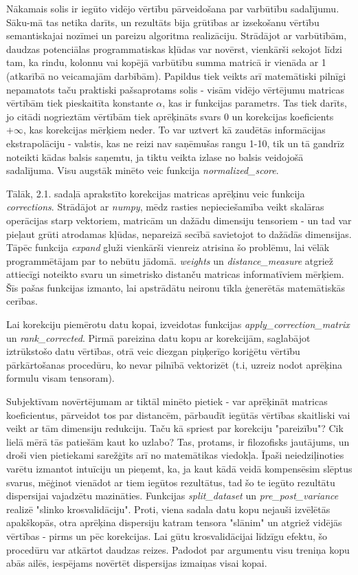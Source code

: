 \documentclass[12pt, a4paper]{article}
\numberwithin{equation}{section} %
\begin{document}
Nākamais solis ir iegūto vidējo vērtību pārveidošana par varbūtību sadalījumu. Sāku-mā tas netika darīts, un rezultāts bija grūtības ar izsekošanu vērtību semantiskajai nozīmei un pareizu algoritma realizāciju. Strādājot ar varbūtībām, daudzas potenciālas programmatiskas kļūdas var novērst, vienkārši sekojot līdzi tam, ka rindu, kolonnu vai kopējā varbūtību summa matricā ir vienāda ar 1 (atkarībā no veicamajām darbībām). Papildus tiek veikts arī matemātiski pilnīgi nepamatots taču praktiski pašsaprotams solis - visām vidējo vērtējumu matricas vērtībām tiek pieskaitīta konstante $\alpha$, kas ir funkcijas parametrs. Tas tiek darīts, jo citādi nogrieztām vērtībām tiek aprēķināts svars 0 un korekcijas koeficients $+\infty$, kas korekcijas mērķiem neder. To var uztvert kā zaudētās informācijas ekstrapolāciju - valstis, kas ne reizi nav saņēmušas rangu 1-10, tik un tā gandrīz noteikti kādas balsis saņemtu, ja tiktu veikta izlase no balsis veidojošā sadalījuma. Visu augstāk minēto veic funkcija \textit{normalized\_score}.

Tālāk, 2.1. sadaļā aprakstīto korekcijas matricas aprēķinu veic funkcija \textit{corrections}. Strādājot ar \textit{numpy}, mēdz rasties nepieciešamība veikt skalāras operācijas starp vektoriem, matricām un dažādu dimensiju tensoriem - un tad var pieļaut grūti atrodamas kļūdas, nepareizā secībā savietojot to dažādās dimensijas. Tāpēc funkcija \textit{expand} gluži vienkārši vienreiz atrisina šo problēmu, lai vēlāk programmētājam par to nebūtu jādomā. \textit{weights} un \textit{distance\_measure} atgriež attiecīgi noteikto svaru un simetrisko distanču matricas informatīviem mērķiem. Šīs pašas funkcijas izmanto, lai apstrādātu neironu tīkla ģenerētās matemātiskās cerības.

Lai korekciju piemērotu datu kopai, izveidotas funkcijas \textit{apply\_correction\_matrix} un \textit{rank\_corrected}. Pirmā pareizina datu kopu ar korekcijām, saglabājot iztrūkstošo datu vērtības, otrā veic diezgan piņķerīgo koriģētu vērtību pārkārtošanas procedūru, ko nevar pilnībā vektorizēt (t.i, uzreiz nodot aprēķina formulu visam tensoram).

Subjektīvam novērtējumam ar tiktāl minēto pietiek - var aprēķināt matricas koeficientus, pārveidot tos par distancēm, pārbaudīt iegūtās vērtības skaitliski vai veikt ar tām dimensiju redukciju. Taču kā spriest par korekciju "pareizību"? Cik lielā mērā tās patiešām kaut ko uzlabo? Tas, protams, ir filozofisks jautājums, un droši vien pietiekami sarežģīts arī no matemātikas viedokļa. Īpaši neiedziļinoties varētu izmantot intuīciju un pieņemt, ka, ja kaut kādā veidā kompensēsim slēptus svarus, mēģinot vienādot ar tiem iegūtos rezultātus, tad šo te iegūto rezultātu dispersijai vajadzētu mazināties. Funkcijas \textit{split\_dataset} un \textit{pre\_post\_variance} realizē "slinko krosvalidāciju". Proti, viena sadala datu kopu nejauši izvēlētās apakškopās, otra aprēķina dispersiju katram tensora "slānim" un atgriež vidējās vērtības - pirms un pēc korekcijas. Lai gūtu krosvalidācijai līdzīgu efektu, šo procedūru var atkārtot daudzas reizes. Padodot par argumentu visu treniņa kopu abās ailēs, iespējams novērtēt dispersijas izmaiņas visai kopai.
\end{document}
